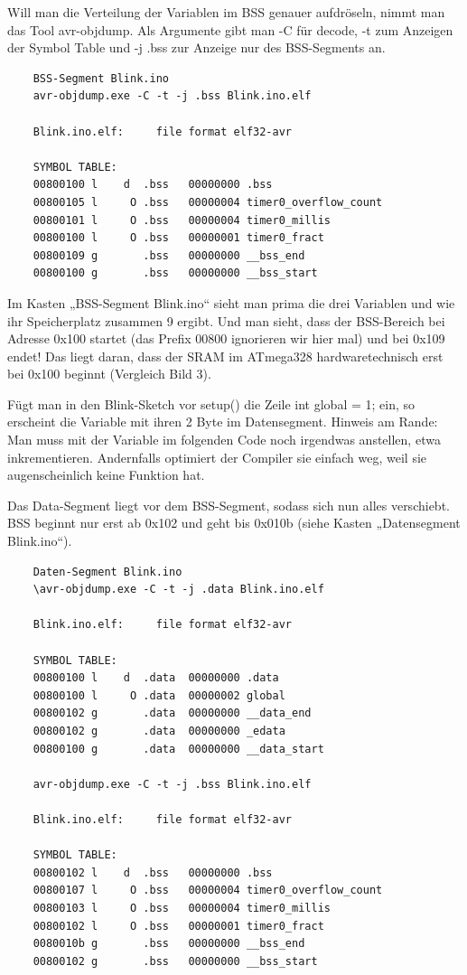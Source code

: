 Will man die Verteilung der Variablen im BSS genauer aufdröseln, nimmt man das Tool avr-objdump. Als Argumente gibt man -C für decode, -t zum Anzeigen der Symbol Table und -j .bss zur Anzeige nur des BSS-Segments an.


\begin{verbatim}
    BSS-Segment Blink.ino
    avr-objdump.exe -C -t -j .bss Blink.ino.elf
    
    Blink.ino.elf:     file format elf32-avr
    
    SYMBOL TABLE:
    00800100 l    d  .bss   00000000 .bss
    00800105 l     O .bss   00000004 timer0_overflow_count
    00800101 l     O .bss   00000004 timer0_millis
    00800100 l     O .bss   00000001 timer0_fract
    00800109 g       .bss   00000000 __bss_end
    00800100 g       .bss   00000000 __bss_start
\end{verbatim}

Im Kasten „BSS-Segment Blink.ino“ sieht man prima die drei Variablen und wie ihr Speicherplatz zusammen 9 ergibt. Und man sieht, dass der BSS-Bereich bei Adresse 0x100 startet (das Prefix 00800 ignorieren wir hier mal) und bei 0x109 endet! Das liegt daran, dass der SRAM im ATmega328 hardwaretechnisch erst bei 0x100 beginnt (Vergleich Bild 3).

Fügt man in den Blink-Sketch vor setup() die Zeile int global = 1; ein, so erscheint die Variable mit ihren 2 Byte im Datensegment. Hinweis am Rande: Man muss mit der Variable im folgenden Code noch irgendwas anstellen, etwa inkrementieren. Andernfalls optimiert der Compiler sie einfach weg, weil sie augenscheinlich keine Funktion hat.

Das Data-Segment liegt vor dem BSS-Segment, sodass sich nun alles verschiebt. BSS beginnt nur erst ab 0x102 und geht bis 0x010b (siehe Kasten „Datensegment Blink.ino“).


\begin{verbatim}
    Daten-Segment Blink.ino
    \avr-objdump.exe -C -t -j .data Blink.ino.elf
    
    Blink.ino.elf:     file format elf32-avr
    
    SYMBOL TABLE:
    00800100 l    d  .data  00000000 .data
    00800100 l     O .data  00000002 global
    00800102 g       .data  00000000 __data_end
    00800102 g       .data  00000000 _edata
    00800100 g       .data  00000000 __data_start
    
    avr-objdump.exe -C -t -j .bss Blink.ino.elf
    
    Blink.ino.elf:     file format elf32-avr
    
    SYMBOL TABLE:
    00800102 l    d  .bss   00000000 .bss
    00800107 l     O .bss   00000004 timer0_overflow_count
    00800103 l     O .bss   00000004 timer0_millis
    00800102 l     O .bss   00000001 timer0_fract
    0080010b g       .bss   00000000 __bss_end
    00800102 g       .bss   00000000 __bss_start
\end{verbatim}

